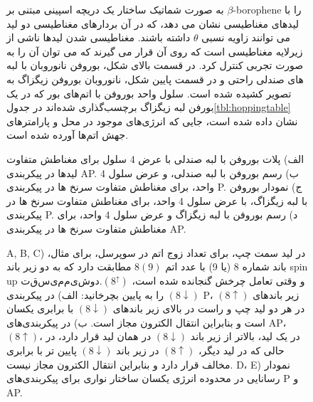 \begin{figure}
\caption{به صورت شماتیک ساختار یک دریچه اسپینی مبتنی بر $\beta$-borophene را با لیدهای مغناطیسی نشان می دهد، که در آن بردارهای مغناطیسی دو لید می توانند زاویه نسبی $\theta$ داشته باشند. مغناطیسی شدن لیدها ناشی از زیرلایه مغناطیسی است که روی آن قرار می گیرند که می توان آن را به صورت تجربی کنترل کرد. در قسمت بالای شکل، بوروفن نانوروبان با لبه های صندلی راحتی و در قسمت پایین شکل، نانوروبان بوروفن زیگزاگ به تصویر کشیده شده است. سلول واحد بوروفن با اتم‌های بور که در یک بورفن لبه زیگزاگ برچسب‌گذاری شده‌اند در جدول\ref{tbl:hoppingtable} نشان داده شده است، جایی که انرژی‌های موجود در محل و پارامترهای جهش اتم‌ها آورده شده است.}
  \label{fig:model}
\end{figure}
    
\begin{figure}[ht]
\centering
\resizebox{0.45\textwidth}{!}{}
\resizebox{0.45\textwidth}{!}{}
\resizebox{0.45\textwidth}{!}{}
\resizebox{0.45\textwidth}{!}{}
\caption{الف) پلات بوروفن با لبه صندلی با عرض 4 سلول برای مغناطش متفاوت لیدها در پیکربندی AP. ب) رسم بوروفن با لبه صندلی، و عرض سلول 4 واحد، برای مغناطش متفاوت سرنخ ها در پیکربندی P. ج) نمودار بوروفن با لبه زیگزاگ، با عرض سلول 4 واحد، برای مغناطش متفاوت سرنخ ها در پیکربندی P. د) رسم بوروفن با لبه زیگزاگ و عرض سلول 4 واحد، برای مغناطش متفاوت سرنخ ها در پیکربندی AP.}
\label{fig:conductance}
\end{figure}
\begin{figure}[ht]
\centering
\resizebox{0.32\textwidth}{!}{}
\resizebox{0.32\textwidth}{!}{}
\resizebox{0.32\textwidth}{!}{}
\resizebox{0.45\textwidth}{!}{}
\resizebox{0.45\textwidth}{!}{}
\caption{A, B, C) در لید سمت چپ، برای تعداد زوج اتم در سوپرسل، برای مثال، باند شماره 8 (یا 9) با عدد اتم $8(9)$ مطابقت دارد که به دو زیر باند spin up $ تقسیم می شود. (8^\uparrow)$ و وقتی تعامل چرخش گنجانده شده است، $(8\downarrow)$ را به پایین بچرخانید: الف) در پیکربندی P، زیر باندهای $(8\uparrow)$ در هر دو لید چپ و راست در بالای زیر باندهای $(8\downarrow)$ با برابری یکسان است و بنابراین انتقال الکترون مجاز است. ب) در پیکربندی‌های AP، $(8\uparrow)$، در یک لید، بالاتر از زیر باند $(8\downarrow)$ در همان لید قرار دارد، در حالی که در لید دیگر، $(8\uparrow) $ در زیر باند $(8\downarrow)$ پایین تر با برابری مخالف قرار دارد و بنابراین انتقال الکترون مجاز نیست. D، E) نمودار رسانایی در محدوده انرژی یکسان ساختار نواری برای پیکربندی‌های P و AP.}
\label{fig:bandconductance}
\end{figure}

